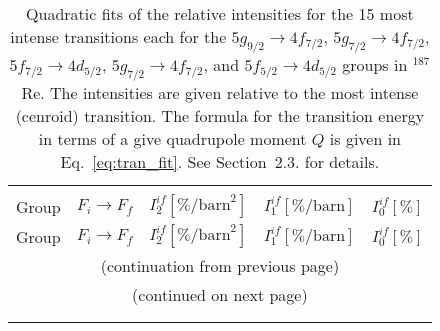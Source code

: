 %
\begin{longtable}{cc|rrr}
\caption{\label{tab:re187intens}%
Quadratic fits of the relative intensities for the 15 most intense transitions each for the $5g_{9/2}\rightarrow4f_{7/2}$, $5g_{7/2}\rightarrow4f_{7/2}$, $5f_{7/2}\rightarrow4d_{5/2}$, $5g_{7/2}\rightarrow4f_{7/2}$, and $5f_{5/2}\rightarrow4d_{5/2}$ groups in $^{187}$Re. The intensities are given relative to the most intense (cenroid) transition. The formula for the transition energy in terms of a give quadrupole moment $Q$ is given in Eq.~\eqref{eq:tran_fit}. See Section~2.3. for details.}
\\\hline\\[-10pt]\hline\\[-10pt]
Group& $F_i \rightarrow F_f$ & $I_2^{if} [\%\text{/barn}^2]$ & $I_1^{if} [\%\text{/barn}]$ & $I_0^{if} [\%]$\\[1pt]\hline
\endfirsthead

Group& $F_i \rightarrow F_f$ & $I_2^{if} [\%\text{/barn}^2]$ & $I_1^{if} [\%\text{/barn}]$ & $I_0^{if} [\%]$\\[1pt]\hline
\multicolumn{5}{c}{{(continuation from previous page)}}\\
\endhead

\multicolumn{5}{c}{{(continued on next page)}}\\ \endfoot
\hline \\[-10pt] \hline
\endlastfoot


\end{longtable}
